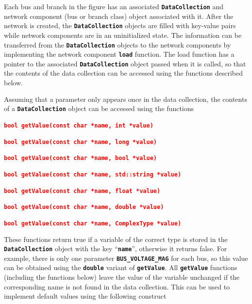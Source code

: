 \documentclass[12pt]{report} %
\begin{document}


Each bus and branch in the figure has an associated \texttt{\textbf{DataCollection}} and network component (bus or branch class) object associated with it. After the network is created, the \texttt{\textbf{DataCollection}} objects are filled with key-value pairs while network components are in an uninitialized state. The information can be transferred from the \texttt{\textbf{DataCollection}} objects to the network components by implementing the network component \texttt{\textbf{load}} function. The load function has a pointer to the associated \texttt{\textbf{DataCollection}} object passed when it is called, so that the contents of the data collection can be accessed using the functions described below.

Assuming that a parameter only appears once in the data collection, the contents of a \texttt{\textbf{DataCollection}} object can be accessed using the functions

\textcolor{red}{\texttt{\textbf{bool getValue(const char *name, int *value)}}}

\textcolor{red}{\texttt{\textbf{bool getValue(const char *name, long *value)}}}

\textcolor{red}{\texttt{\textbf{bool getValue(const char *name, bool *value)}}}

\textcolor{red}{\texttt{\textbf{bool getValue(const char *name, std::string *value)}}}

\textcolor{red}{\texttt{\textbf{bool getValue(const char *name, float *value)}}}

\textcolor{red}{\texttt{\textbf{bool getValue(const char *name, double *value)}}}

\textcolor{red}{\texttt{\textbf{bool getValue(const char *name, ComplexType *value)}}}

These functions return true if a variable of the correct type is stored in the \texttt{\textbf{DataCollection}} object with the key ``\texttt{\textbf{name}}'', otherwise it returns false. For example, there is only one parameter \texttt{\textbf{BUS\_VOLTAGE\_MAG}} for each bus, so this value can be obtained using the \texttt{\textbf{double}} variant of \texttt{\textbf{getValue}}.
All \texttt{\textbf{getValue}} functions (including the functions below) leave the value of the variable unchanged if the corresponding name is not found in the data collection. This can be used to implement default values using the following construct
\end{document}

